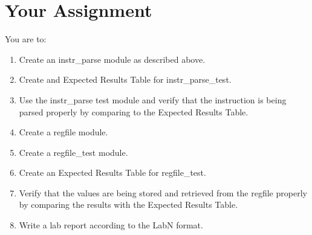 \clearpage
\section{Your Assignment}

You are to:
\begin{enumerate}
\item Create an instr\_parse module as described above.
\item Create and Expected Results Table for instr\_parse\_test.
\item Use the instr\_parse test module and verify that the instruction is being parsed properly by comparing to the Expected Results Table.
\item Create a regfile module.
\item Create a regfile\_test module.
\item Create an Expected Results Table for regfile\_test.
\item Verify that the values are being stored and retrieved from the regfile properly by comparing the results with the Expected Results Table.
\item Write a lab report according to the LabN format.
\end{enumerate} 